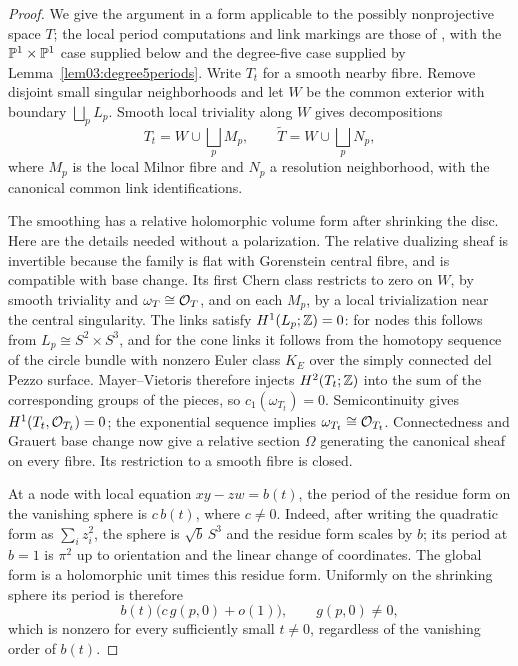 \begin{proof}
We give the argument in a form applicable to the possibly nonprojective
space $T$; the local period computations and link markings are those
of \cite[\S\S3--4]{PaperIV}, with the
$\mathbb{P}^1\times\mathbb{P}^1$ case supplied below and the degree-five
case supplied by Lemma~\ref{lem03:degree5periods}.
Write $T_t$ for a smooth nearby fibre.
Remove disjoint small singular neighborhoods and let $W$ be the
common exterior with boundary $\bigsqcup_pL_p$.  Smooth local
triviality along $W$ gives decompositions
\[
 T_t=W\cup\bigsqcup_p M_p,\qquad
 \widetilde T=W\cup\bigsqcup_p N_p,
\]
where $M_p$ is the local Milnor fibre and $N_p$ a resolution
neighborhood, with the canonical common link identifications.

The smoothing has a relative holomorphic volume form after shrinking
the disc.  Here are the details needed without a polarization.  The
relative dualizing sheaf is invertible because the family is flat
with Gorenstein central fibre, and is compatible with base change.
Its first Chern class restricts to zero on $W$, by smooth triviality
and $\omega_T\cong\mathcal{O}_T$, and on each $M_p$, by a local
trivialization near the central singularity.  The links satisfy
$H^1(L_p;\mathbb{Z})=0$: for nodes this follows from
$L_p\cong S^2\times S^3$, and for the cone links it follows from
the homotopy sequence of the circle bundle with nonzero Euler class
$K_E$ over the simply connected del Pezzo surface.  Mayer--Vietoris
therefore injects $H^2(T_t;\mathbb{Z})$ into the sum of the corresponding
groups of the pieces, so $c_1(\omega_{T_t})=0$.  Semicontinuity gives
$H^1(T_t,\mathcal{O}_{T_t})=0$; the exponential sequence implies
$\omega_{T_t}\cong\mathcal{O}_{T_t}$.  Connectedness and Grauert base
change now give a relative section $\Omega$ generating the canonical
sheaf on every fibre.  Its restriction to a smooth fibre is closed.

At a node with local equation $xy-zw=b(t)$, the period of the
residue form on the vanishing sphere is $c\,b(t)$, where $c\ne0$.
Indeed, after writing the quadratic form as $\sum_i z_i^2$, the
sphere is $\sqrt b\,S^3$ and the residue form scales by $b$;
its period at $b=1$ is $\pi^2$ up to orientation and the linear
change of coordinates.  The global form is a holomorphic unit times
this residue form.  Uniformly on the shrinking sphere its period is
therefore
\[
 b(t)\bigl(c\,g(p,0)+o(1)\bigr),\qquad g(p,0)\ne0,
\]
which is nonzero for every sufficiently small $t\ne0$, regardless
of the vanishing order of $b(t)$.


\end{proof}
